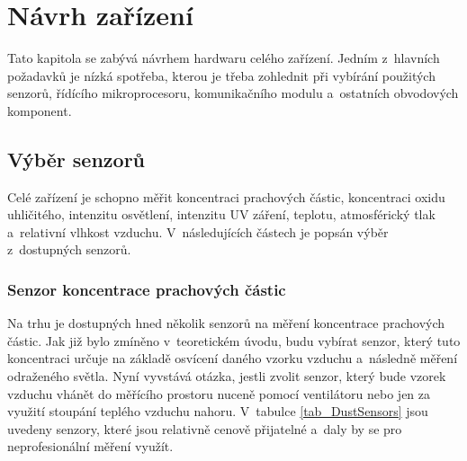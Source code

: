 \chapter{Návrh zařízení}

Tato kapitola se zabývá návrhem hardwaru celého zařízení. Jedním z~hlavních požadavků je nízká spotřeba, kterou je třeba zohlednit při vybírání použitých senzorů, řídícího mikroprocesoru, komunikačního modulu a~ostatních obvodových komponent. 

\section{Výběr senzorů}
Celé zařízení je schopno měřit koncentraci prachových částic, koncentraci oxidu uhličitého, intenzitu osvětlení, intenzitu UV záření, teplotu, atmosférický tlak a~relativní vlhkost vzduchu. V~následujících částech je popsán výběr z~dostupných senzorů.

\subsection{Senzor koncentrace prachových částic}

Na trhu je dostupných hned několik senzorů na měření koncentrace prachových částic. Jak již bylo zmíněno v~teoretickém úvodu, budu vybírat senzor, který tuto koncentraci určuje na základě osvícení daného vzorku vzduchu a~následně měření odraženého světla. Nyní vyvstává otázka, jestli zvolit senzor, který bude vzorek vzduchu vhánět do měřícího prostoru nuceně pomocí ventilátoru nebo jen za využití stoupání teplého vzduchu nahoru. V~tabulce \ref{tab_DustSensors} jsou uvedeny senzory, které jsou relativně cenově přijatelné a~daly by se pro neprofesionální měření využít.

\newcommand{\ugcm}{\micro\gram\per\cubic\meter} %

